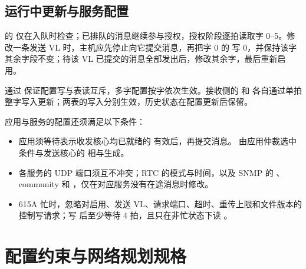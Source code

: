 \subsection{运行中更新与服务配置}

 的  仅在入队时检查；已排队的消息继续参与授权，授权阶段逐拍读取字 0--5。修改一条发送 VL 时，主机应先停止向它提交消息，再把字 0 的  写 0，并保持该字其余字段不变；待该 VL 已提交的消息全部发出后，修改其余字，最后重新启用。

通过  保证配置写与表读互斥，多字配置按字依次生效。接收侧的  和  各自通过单拍整字写入更新；两表的写入分别生效，历史状态在配置更新后保留。

应用与服务的配置还须满足以下条件：
\begin{itemize}
  \item 应用须等待表示收发核心均已就绪的  有效后，再提交消息。 由应用仲裁选中条件与发送核心的  相与生成。
  \item 各服务的 UDP 端口须互不冲突；RTC 的模式与时间，以及 SNMP 的 、\mbox{community} 和 ，仅在对应服务没有在途消息时修改。
  \item 615A 忙时，忽略对启用、发送 VL、请求端口、超时、重传上限和文件版本的控制写请求；写  后至少等待 4 拍，且只在非忙状态下读 。
\end{itemize}

\section{配置约束与网络规划规格}\label{sec:cfgrule}


